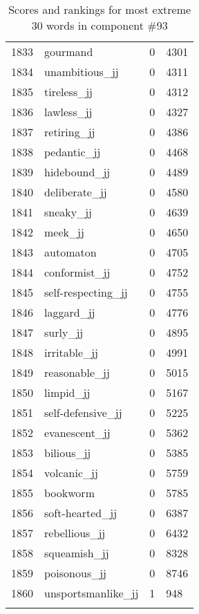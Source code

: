 \begin{longtable}[!htbp]{| rlr@{.}l |}
    1833 & gourmand & 0 & 4301 \\
    1834 & unambitious\_jj & 0 & 4311 \\
    1835 & tireless\_jj & 0 & 4312 \\
    1836 & lawless\_jj & 0 & 4327 \\
    1837 & retiring\_jj & 0 & 4386 \\
    1838 & pedantic\_jj & 0 & 4468 \\
    1839 & hidebound\_jj & 0 & 4489 \\
    1840 & deliberate\_jj & 0 & 4580 \\
    1841 & sneaky\_jj & 0 & 4639 \\
    1842 & meek\_jj & 0 & 4650 \\
    1843 & automaton & 0 & 4705 \\
    1844 & conformist\_jj & 0 & 4752 \\
    1845 & self-respecting\_jj & 0 & 4755 \\
    1846 & laggard\_jj & 0 & 4776 \\
    1847 & surly\_jj & 0 & 4895 \\
    1848 & irritable\_jj & 0 & 4991 \\
    1849 & reasonable\_jj & 0 & 5015 \\
    1850 & limpid\_jj & 0 & 5167 \\
    1851 & self-defensive\_jj & 0 & 5225 \\
    1852 & evanescent\_jj & 0 & 5362 \\
    1853 & bilious\_jj & 0 & 5385 \\
    1854 & volcanic\_jj & 0 & 5759 \\
    1855 & bookworm & 0 & 5785 \\
    1856 & soft-hearted\_jj & 0 & 6387 \\
    1857 & rebellious\_jj & 0 & 6432 \\
    1858 & squeamish\_jj & 0 & 8328 \\
    1859 & poisonous\_jj & 0 & 8746 \\
    1860 & unsportsmanlike\_jj & 1 & 948 \\
    \hline
    \caption{Scores and rankings for most extreme 30 words in component \#93} \\
\end{longtable}
